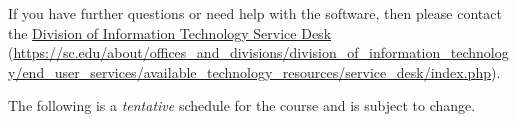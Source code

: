 \documentclass[11pt,letterpaper]{article}
\begin{document}
If you have further questions or need help with the software, then please contact the \href{https://sc.edu/about/offices\_and\_divisions/division\_of\_information\_technology/end\_user\_services/available\_technology\_resources/service\_desk/index.php}{Division of Information Technology Service Desk} (\url{https://sc.edu/about/offices\_and\_divisions/division\_of\_information\_technology/end\_user\_services/available\_technology\_resources/service\_desk/index.php}). \sectionbreak





\newpage






The following is a \emph{tentative} schedule for the course and is subject to change. 
\end{document}
